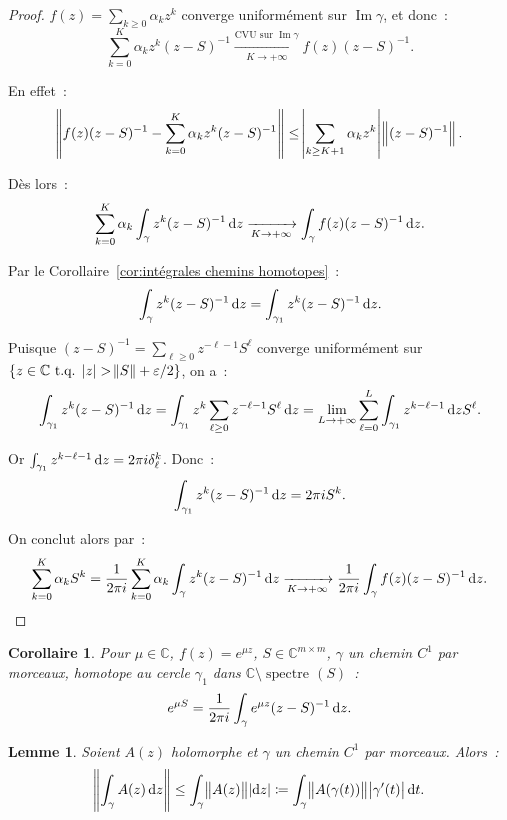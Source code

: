 \documentclass{report}
\DeclareMathOperator{\spectreOperator}{spectre\!}
\DeclareMathOperator{\Imapp}{Im}
\newcommand{\C}{{\mathbb C}}
\newcommand{\tq}{\text{ t.q. }}
\newcommand{\st}{\tq}
\newcommand{\pinfty}{{+\infty}}
\newcommand{\spectre}[1]{{\spectreOperator\left(#1\right)}}
\newtheorem{cor}[thm]{Corollaire}
\newtheorem{lem}[thm]{Lemme}
\theoremstyle{definition}
\theoremstyle{remark}
\begin{document}
\begin{proof} $f(z) = \sum_{k \geq 0}\alpha_kz^k$ converge uniformément sur $\Imapp \gamma$, et donc~:
\[\sum_{k=0}^K\alpha_kz^k(z-S)^{-1} \xrightarrow[K \to \pinfty]{\text{CVU sur } \Imapp \gamma} f(z)(z-S)^{-1}.\]

En effet~:
\[\norm {f(z)(z-S)^{-1} - \sum_{k=0}^K\alpha_kz^k(z-S)^{-1}} \leq \abs {\sum_{k \geq K+1}\alpha_kz^k}\norm {(z-S)^{-1}}.\]

Dès lors~:
\[\sum_{k=0}^K\alpha_k\int_\gamma z^k(z-S)^{-1}\dif z \xrightarrow[K \to \pinfty]{} \int_\gamma f(z)(z-S)^{-1}\dif z.\]

Par le Corollaire~\ref{cor:intégrales chemins homotopes}~:
\[\int_\gamma z^k(z-S)^{-1}\dif z = \int_{\gamma_1}z^k(z-S)^{-1}\dif z.\]

Puisque $(z-S)^{-1} = \sum_{\ell \geq 0}z^{-\ell-1}S^\ell$ converge uniformément sur $\{z \in \C \st \abs z > \norm S + \varepsilon/2\}$, on a~:
\[\int_{\gamma_1}z^k(z-S)^{-1}\dif z = \int_{\gamma_1}z^k\sum_{\ell \geq 0}z^{-\ell-1}S^\ell\dif z = \lim_{L \to \pinfty}\sum_{\ell=0}^L\int_{\gamma_1}z^{k-\ell-1}\dif zS^\ell.\]

Or $\int_{\gamma_1}z^{k-\ell-1}\dif z = 2\pi i \delta_\ell^k$. Donc~:
\[\int_{\gamma_1}z^k(z-S)^{-1}\dif z = 2\pi iS^k.\]

On conclut alors par~:
\[\sum_{k=0}^K\alpha_kS^k = \frac 1{2\pi i}\sum_{k=0}^K\alpha_k\int_\gamma z^k(z-S)^{-1}\dif z \xrightarrow[K \to \pinfty]{} \frac 1{2\pi i}\int_\gamma f(z)(z-S)^{-1}\dif z.\]
\end{proof}

\begin{cor}\label{cor:Cauchy e^(mu S)} Pour $\mu \in \C$, $f(z) = e^{\mu z}$, $S \in \C^{m \times m}$, $\gamma$ un chemin $C^1$ par morceaux, homotope au cercle $\gamma_1$ dans $\C \setminus \spectre S$~:
\[e^{\mu S} = \frac 1{2\pi i}\int_\gamma e^{\mu z}(z-S)^{-1}\dif z.\]
\end{cor}

\begin{lem} Soient $A(z)$ holomorphe et $\gamma$ un chemin $C^1$ par morceaux. Alors~:
\[\norm {\int_\gamma A(z)\dif z} \leq \int_\gamma\norm {A(z)}\abs {\dif z} \coloneqq \int_\gamma \norm {A(\gamma(t))}\abs {\gamma'(t)}\dif t.\]
\end{lem}
\end{document}
